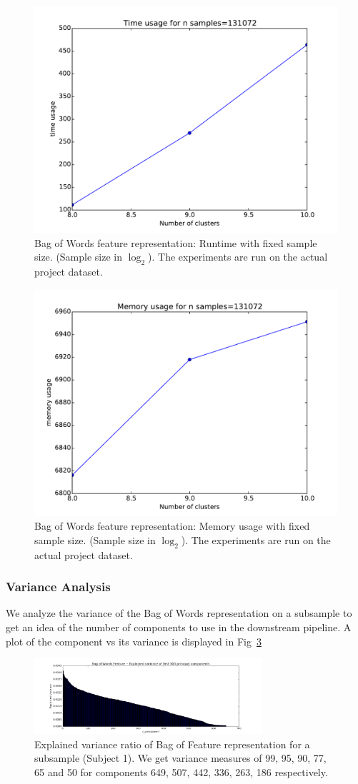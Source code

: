\documentclass[final,leqno,onefignum,onetabnum]{siamltexmm}
\begin{document}
\begin{figure}
  \centering
  \includegraphics[width=0.60\linewidth]{images/bofwTimeFixedSample}
  \caption{Bag of Words feature representation: Runtime with fixed sample size. (Sample size in $\log_{2}$).  The experiments are run on the actual project dataset.\label{fig:bowf_time_fixed_sample}}
\end{figure}
\begin{figure}
  \centering
  \includegraphics[width=0.60\linewidth]{images/bofwMemoryFixedSample}
  \caption{Bag of Words feature representation: Memory usage with fixed sample size. (Sample size in $\log_{2}$).  The experiments are run on the actual project dataset.\label{fig:bowf_memory_fixed_sample}}
\end{figure}

\subsubsection{Variance Analysis}
We analyze the variance of the Bag of Words representation on a subsample to get an idea of the number of components to use in the downstream pipeline.  A plot of the component vs its variance is displayed in Fig~\ref{fig:bowf_variance}
\begin{figure}
  \centering
  \includegraphics[width=0.75\textwidth]{images/bowf_variance}
  \caption{Explained variance ratio of Bag of Feature representation for a subsample (Subject 1).  We get variance measures of 99, 95, 90, 77, 65 and 50 for components 649, 507, 442, 336, 263, 186 respectively.\label{fig:bowf_variance}} 
\end{figure}
\end{document}
